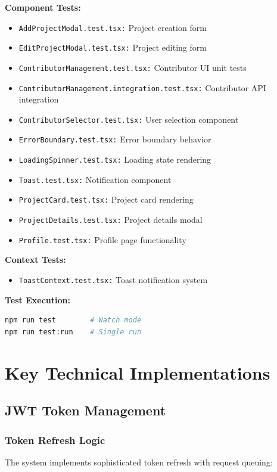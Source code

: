 \documentclass[11pt,a4paper]{article}
\begin{document}
\textbf{Component Tests:}
\begin{itemize}[leftmargin=*]
    \item \texttt{AddProjectModal.test.tsx:} Project creation form
    \item \texttt{EditProjectModal.test.tsx:} Project editing form
    \item \texttt{ContributorManagement.test.tsx:} Contributor UI unit tests
    \item \texttt{ContributorManagement.integration.test.tsx:} Contributor API integration
    \item \texttt{ContributorSelector.test.tsx:} User selection component
    \item \texttt{ErrorBoundary.test.tsx:} Error boundary behavior
    \item \texttt{LoadingSpinner.test.tsx:} Loading state rendering
    \item \texttt{Toast.test.tsx:} Notification component
    \item \texttt{ProjectCard.test.tsx:} Project card rendering
    \item \texttt{ProjectDetails.test.tsx:} Project details modal
    \item \texttt{Profile.test.tsx:} Profile page functionality
\end{itemize}

\textbf{Context Tests:}
\begin{itemize}[leftmargin=*]
    \item \texttt{ToastContext.test.tsx:} Toast notification system
\end{itemize}

\textbf{Test Execution:}
\begin{lstlisting}[language=bash]
npm run test        # Watch mode
npm run test:run    # Single run
\end{lstlisting}

\section{Key Technical Implementations}

\subsection{JWT Token Management}

\subsubsection{Token Refresh Logic}
The system implements sophisticated token refresh with request queuing:
\end{document}
